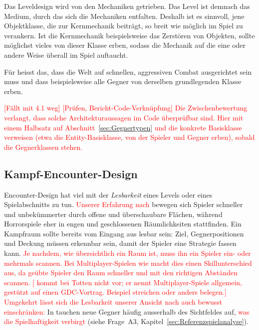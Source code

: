 \documentclass[../Main.tex]{subfiles}
\begin{document}
Das Leveldesign wird von den Mechaniken getrieben. Das Level ist demnach das Medium, durch das sich die Mechaniken entfalten.\autocite{gdc_tenprinciples2010} Deshalb ist es sinnvoll, jene Objektklasse, die zur Kernmechanik beiträgt, so breit wie möglich im Spiel zu verankern. Ist die Kernmechanik beispielsweise das Zerstören von Objekten, sollte möglichst vieles von dieser Klasse erben, sodass die Mechanik auf die eine oder andere Weise überall im Spiel auftaucht.\autocite{gdc_movingmountains2020}

Für  heisst das, dass die Welt auf schnellen, aggressiven Combat ausgerichtet sein muss und dass beispielsweise alle Gegner von derselben grundlegenden Klasse erben.\endgroup

\textcolor{red}{[Fällt mit 4.1 weg] [Prüfen, Bericht-Code-Verknüpfung] Die Zwischenbewertung verlangt, dass solche Architekturaussagen im Code überprüfbar sind. Hier mit einem Halbsatz auf Abschnitt~\ref{sec:Gegnertypen} und die konkrete Basisklasse verweisen (etwa die Entity-Basisklasse, von der Spieler und Gegner erben), sobald die Gegnerklassen stehen.}

\subsection{Kampf-Encounter-Design} \label{sec:Encounter}
Encounter-Design hat viel mit der \textit{Lesbarkeit} eines Levels oder eines Spielabschnitts zu tun. \textcolor{red}{Unserer Erfahrung nach} bewegen sich Spieler schneller und unbekümmerter durch offene und überschaubare Flächen, während Horrorspiele eher in engen und geschlossenen Räumlichkeiten stattfinden. Ein Kampfraum sollte bereits vom Eingang aus lesbar sein: Ziel, Gegnerpositionen und Deckung müssen erkennbar sein, damit der Spieler eine Strategie fassen kann.\autocite{gdc_horizonquests2018} \textcolor{red}{Je nachdem, wie übersichtlich ein Raum ist, muss ihn ein Spieler ein- oder mehrmals scannen. Bei Multiplayer-Spielen wie \autocite{valve_counterstrike_2000} macht dies einen Skillunterschied aus, da geübte Spieler den Raum schneller und mit den richtigen Abständen scannen.\autocite[122--123]{totten2014architectural} \textcolor{red}{[ kommt bei Totten nicht vor; er nennt Multiplayer-Spiele allgemein, gestützt auf einen GDC-Vortrag. Beispiel streichen oder anders belegen.]}} \textcolor{red}{Umgekehrt lässt sich die Lesbarkeit unserer Ansicht nach auch bewusst einschränken:} In  tauchen neue Gegner häufig ausserhalb des Sichtfeldes auf, \textcolor{red}{was die Spielhaftigkeit verbirgt} (siehe Frage~A3, Kapitel~\ref{sec:Referenzspielanalyse}).
\end{document}
